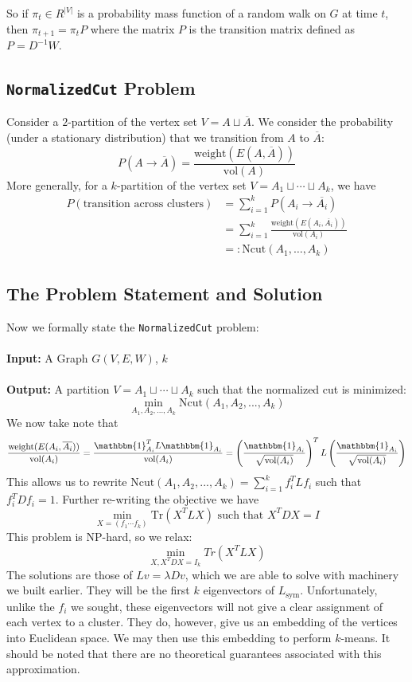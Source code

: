 So if $\pi_t \in R^{|V|}$ is a probability mass function of a random walk on $G$ at time $t$, then $\pi_{t+1} = \pi_t P$ where the matrix $P$ is the transition matrix defined as $P = D^{-1}W$.

\subsection{\texttt{NormalizedCut} Problem}
Consider a $2$-partition of the vertex set $V=A\sqcup\overline A$. We consider the probability (under a stationary distribution) that we transition from $A$ to $\overline A$:
$$P(A \rightarrow \overline{A}) = \frac{\text{weight}(E(A,\overline{A}))}{\text{vol}(A)}$$
More generally, for a $k$-partition of the vertex set $V=A_1\sqcup\cdots\sqcup A_k$, we have 
\begin{align*}
P(\text{transition across clusters})&= \sum_{i=1}^k P(A_i \rightarrow \overline{A_i})\\
&= \sum_{i=1}^k \frac{\text{weight}(E(A_i,\overline{A_i}))}{\text{vol}(A_i)}\\
&=:\text{Ncut}(A_1,\ldots,A_k)
\end{align*}

\subsection{The Problem Statement and Solution}
Now we formally state the \texttt{NormalizedCut} problem: 
\\\\
\noindent
\textbf{Input:} A Graph \(G(V, E, W)\), $k$
\\\\
\noindent
\textbf{Output:} A partition $V=A_1\sqcup\cdots\sqcup A_k$ such that the normalized cut is minimized: 
\[
\min_{A_1,A_2,...,A_k}\text{Ncut}(A_1,A_2,...,A_k) 
\]
We now take note that 
$$ \frac{\text{weight}(E(A_i,\overline{A_i}))}{\text{vol}(A_i)} = \frac{\mathbbm{1}^T_{A_i}L\mathbbm{1}_{A_i}}{\text{vol}(A_i)}=  \left(\frac{\mathbbm{1}_{A_i}}{\sqrt{\text{vol}(A_i)}}\right)^T L \left(\frac{\mathbbm{1}_{A_i}}{\sqrt{\text{vol}(A_i)}}\right)$$
This allows us to rewrite $\text{Ncut}(A_1,A_2,...,A_k)=\sum_{i=1}^kf_i^TLf_i$ such that $f_i^TDf_i=1$. Further re-writing the objective we have
$$\min_{X=(f_1\cdots f_k)}\text{Tr}(X^TLX) \text{ such that } X^TDX=I$$
This problem is NP-hard, so we relax:
$$\min_{X, X^TDX = I_k}Tr(X^T L X) $$
The solutions are those of $Lv=\lambda Dv$, which we are able to solve with machinery we built earlier. They will be the first $k$ eigenvectors of $L_{\text{sym}}$. Unfortunately, unlike the $f_i$ we sought, these eigenvectors will not give a clear assignment of each vertex to a cluster. They do, however, give us an embedding of the vertices into Euclidean space. We may then use this embedding to perform $k$-means. It should be noted that there are no theoretical guarantees associated with this approximation.


